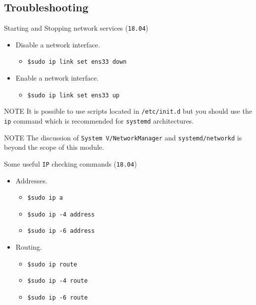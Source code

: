 \documentclass[aspectratio=169]{beamer}
\begin{document}
\subsection{Troubleshooting}
\begin{frame}{Starting and Stopping network services (\texttt{18.04})}
  \begin{itemize}
    \item Disable a network interface.
    \begin{itemize}
      \item \texttt{\$sudo ip link set ens33 down}
    \end{itemize}
  \end{itemize}
  \begin{itemize}
    \item Enable a network interface.
    \begin{itemize}
      \item \texttt{\$sudo ip link set ens33 up}
    \end{itemize}
  \end{itemize}
  \begin{block}{NOTE}
    It is possible to use scripts located in \texttt{/etc/init.d} but you should use the \texttt{ip} command which is recommended for \texttt{systemd} architectures.  
  \end{block}
  \begin{block}{NOTE}
    The discussion of \texttt{System V/NetworkManager} and \texttt{systemd/networkd} is beyond the scope of this module.  
  \end{block}
\end{frame}

\begin{frame}{Some useful \texttt{IP} checking commands (\texttt{18.04})}
  \begin{itemize}
    \item Addresses.
    \begin{itemize}
      \item \texttt{\$sudo ip a}
      \item \texttt{\$sudo ip -4 address}
      \item \texttt{\$sudo ip -6 address}
    \end{itemize}
    \item Routing.
    \begin{itemize}
      \item \texttt{\$sudo ip route}
      \item \texttt{\$sudo ip -4 route}
      \item \texttt{\$sudo ip -6 route}
    \end{itemize}
  \end{itemize}
\end{frame}
\end{document}
